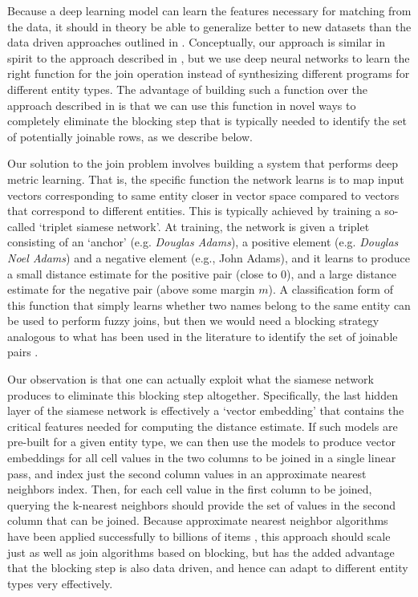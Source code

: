 Because a deep learning model can learn the features necessary for matching from the data, it should in theory be able to generalize better to new datasets than the data driven approaches outlined in \cite{He:2015:SJS:2824032.2824036}.   Conceptually, our approach is similar in spirit to the approach described in \cite{auto-join-joining-tables-leveraging-transformations}, but we use deep neural networks to learn the right function for the join operation instead of synthesizing different programs for different entity types.  The advantage of building such a function over the approach described in \cite{auto-join-joining-tables-leveraging-transformations} is that we can use this function in novel ways to completely eliminate the blocking step that is typically needed to identify the set of potentially joinable rows, as we describe below.  

Our solution to the join problem involves building a system that performs deep metric learning.  That is, the specific function the network learns is to map input vectors corresponding to same entity closer in vector space compared to vectors that correspond to different entities.  This is typically achieved by training a so-called `triplet siamese network'.  At training, the network is given a triplet consisting of an `anchor' (e.g. \textit{Douglas Adams}), a positive element (e.g. \textit{Douglas Noel Adams}) and a negative element (e.g., John Adams), and it learns to produce a small distance estimate for the positive pair (close to 0), and a large distance estimate for the negative pair (above some margin $m$). A classification form of this function that simply learns whether two names belong to the same entity can be used to perform fuzzy joins, but then we would need a blocking strategy analogous to what has been used in the literature to identify the set of joinable pairs \cite{auto-join-joining-tables-leveraging-transformations}.  

Our observation is that one can actually exploit what the siamese network produces to eliminate this blocking step altogether.  Specifically, the last hidden layer of the siamese network is effectively a `vector embedding' that contains the critical features needed for computing the distance estimate.  If such models are pre-built for a given entity type, we can then use the models to produce vector embeddings for all cell values in the two columns to be joined in a single linear pass, and index just the second column values in an approximate nearest neighbors index.  Then, for each cell value in the first column to be joined, querying the k-nearest neighbors should provide the set of values in the second column that can be joined.  Because approximate nearest neighbor algorithms have been applied successfully to billions of items \cite{JDH17}, this approach should scale just as well as join algorithms based on blocking, but has the added advantage that the blocking step is also data driven, and hence can adapt to different entity types very effectively.

